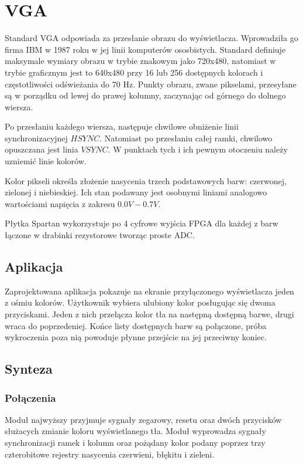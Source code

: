 \documentclass[a4paper,12pt]{article}
\begin{document}
\newpage
\section{VGA}
Standard VGA odpowiada za przesłanie obrazu do wyświetlacza. Wprowadziła go firma IBM w 1987 roku w jej linii komputerów ososbistych. Standard definiuje maksymale wymiary obrazu w trybie znakowym jako 720x480, natomiast w trybie  graficznym jest to 640x480 przy 16 lub 256 dostępnych kolorach i częstotliwości odświeżania do 70 Hz. Punkty obrazu, zwane pikselami, przesyłane są w porządku od lewej do prawej kolumny, zaczynając od górnego do dolnego wiersza.

Po przesłaniu każdego wiersza, następuje chwilowe obniżenie linii synchronizacyjnej $HSYNC$. Natomiast po przesłaniu całej ramki, chwilowo opuszczana jest linia $VSYNC$. W punktach tych i ich pewnym otoczeniu należy uzniemić linie kolorów.

Kolor pikseli określa złożenie nasycenia trzech podstawowych barw: czerwonej, zielonej i niebieskiej. Ich stan podawany jest osobnymi liniami analogowo wartościami napięcia z zakresu $0.0V - 0.7V$.

Płytka Spartan wykorzystuje po 4 cyfrowe wyjścia FPGA dla każdej z barw łączone w drabinki rezystorowe tworząc proste ADC.

\subsection{Aplikacja}
Zaprojektowana aplikacja pokazuje na ekranie przyłączonego wyświetlacza jeden z ośmiu kolorów. Użytkownik wybiera ulubiony kolor posługując się dwoma przyciskami. Jeden z nich przełącza kolor tła na następną dostępną barwe, drugi wraca do poprzedeniej. Końce listy dostępnych barw są połączone, próba wykroczenia poza nią powoduje płynne przejście na jej przeciwny koniec.

\subsection{Synteza}

\subsubsection{Połączenia}

Moduł najwyższy przyjmuje sygnały zegarowy, resetu oraz dwóch przycisków służacych zmianie koloru wyświetlanego tła. Moduł wyprowadza sygnały synchronizacji ramek i kolumn oraz pożądany kolor podany poprzez trzy czterobitowe rejestry nasycenia czerwieni, błękitu i zieleni.
\end{document}

